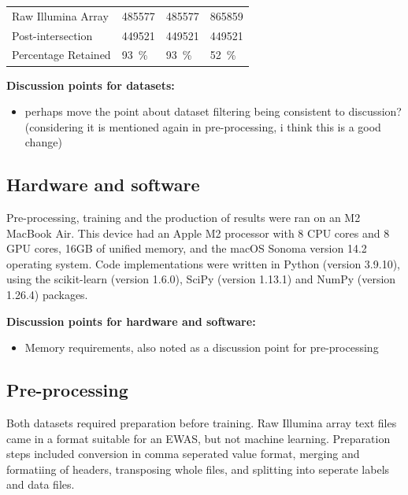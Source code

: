 \documentclass{article}
\begin{document}
\begin{table}
\begin{tabularx}{\textwidth}{X >{\raggedleft\arraybackslash}X >{\raggedleft\arraybackslash}X >{\raggedleft\arraybackslash}X}
        \midrule
        Raw Illumina Array                   & \num{485577}                                  & \num{485577}                                 & \num{865859}                          \\
        Post-intersection                    & \num{449521}                                  & \num{449521}                                 & \num{449521}                          \\
        Percentage Retained                  & \SI{93}{\percent}                             & \SI{93}{\percent}                            & \SI{52}{\percent}                     \\
        \bottomrule
    \end{tabularx}
\end{table}

\vspace{1cm}
\textbf{Discussion points for datasets:}
\begin{itemize}
    \item perhaps move the point about dataset filtering being consistent to discussion? (considering it is mentioned again in pre-processing, i think this is a good change)
\end{itemize}

\subsection{Hardware and software}
Pre-processing, training and the production of results were ran on an M2 MacBook Air. This device had an Apple M2 processor with 8 CPU cores and 8 GPU cores, 16GB of unified memory, and the macOS Sonoma version 14.2 operating system. Code implementations were written in Python (version 3.9.10), using the scikit-learn (version 1.6.0), SciPy (version 1.13.1) and NumPy (version 1.26.4) packages.

\textbf{Discussion points for hardware and software:}
\begin{itemize}
    \item Memory requirements, also noted as a discussion point for pre-processing
\end{itemize}

\subsection{Pre-processing} \label{sec:pre-processing}
Both datasets required preparation before training. Raw Illumina array text files came in a format suitable for an EWAS, but not machine learning. Preparation steps included conversion in comma seperated value format, merging and formatiing of headers, transposing whole files, and splitting into seperate labels and data files.
\end{document}
